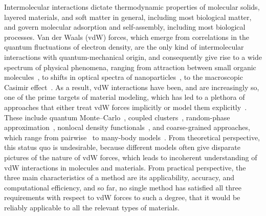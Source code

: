 Intermolecular interactions dictate thermodynamic properties of molecular solids, layered materials, and soft matter in general, including most biological matter, and govern molecular adsorption and self-assembly, including most biological processes.
Van der Waals (vdW) forces, which emerge from correlations in the quantum fluctuations of electron density, are the only kind of intermolecular interactions with quantum-mechanical origin, and consequently give rise to a wide spectrum of physical phenomena, ranging from attraction between small organic molecules~\citep{LondonZP30}, to shifts in optical spectra of nanoparticles~\citep{LuoP14}, to the macroscopic Casimir effect~\citep{JaffePRD05}.
As a result, vdW interactions have been, and are increasingly so, one of the prime targets of material modeling, which has led to a plethora of approaches that either treat vdW forces implicitly or model them explicitly~\citep{KlimesJCP12,HermannCR17}.
These include quantum Monte--Carlo~\citep{AmbrosettiJPCL14}, coupled clusters~\citep{YangS14}, random-phase approximation~\citep{LuPRL09}, nonlocal density functionals~\citep{DionPRL04,VydrovPRL09}, and coarse-grained approaches, which range from pairwise~\citep{GrimmeJCC04,BeckeJCP07,TkatchenkoPRL09} to many-body models~\citep{TkatchenkoPRL12,SilvestrelliJCP13}.
From theoretical perspective, this status quo is undesirable, because different models often give disparate pictures of the nature of vdW forces, which leads to incoherent understanding of vdW interactions in molecules and materials.
From practical perspective, the three main characteristics of a method are its applicability, accuracy, and computational efficiency, and so far, no single method has satisfied all three requirements with respect to vdW forces to such a degree, that it would be reliably applicable to all the relevant types of materials.

